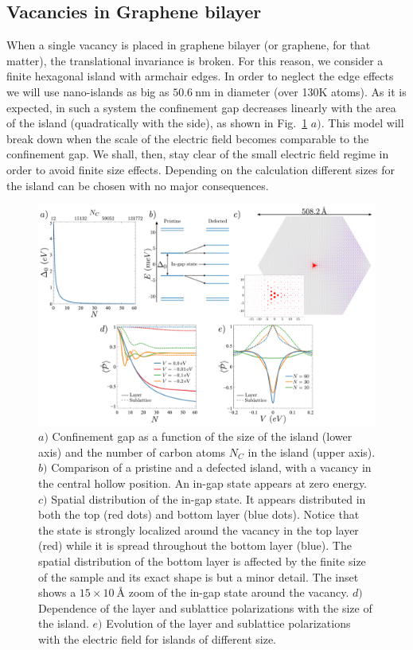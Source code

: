 \subsection{Vacancies in Graphene bilayer}
When a single vacancy is placed in graphene bilayer (or graphene, for that matter), the translational invariance is broken. For this reason, we consider a finite hexagonal island with armchair edges. In order to neglect the edge effects we will use nano-islands as big as $\SI{50.6}{\nm}$ in diameter (over 130K atoms). %
As it is expected, in such a system the confinement gap decreases linearly with the area of the island (quadratically with the side), as shown in Fig.~\ref{confinement} $a)$. This model will break down when the scale of the electric field becomes comparable to the confinement gap. We shall, then, stay clear of the small electric field regime in order to avoid finite size effects. Depending on the calculation different sizes for the island can be chosen with no major consequences.
\begin{figure}[!ht!]
\centering
\includegraphics[width=\textwidth]{artlat/fig/confinement.pdf}
\vspace{-20pt}
\caption{$a)$ Confinement gap as a function of the size of the island (lower axis) and the number of carbon atoms $N_C$ in the island (upper axis). $b)$ Comparison of a pristine and a defected island, with a vacancy in the central hollow position. An in-gap state appears at zero energy. $c)$ Spatial distribution of the in-gap state. It appears distributed in both the top (red dots) and bottom layer (blue dots). Notice that the state is strongly localized around the vacancy in the top layer (red) while it is spread throughout the bottom layer (blue). The spatial distribution of the bottom layer is affected by the finite size of the sample and its exact shape is but a minor detail. The inset shows a $15\times\SI{10}{\angstrom}$ zoom of the in-gap state around the vacancy. $d)$ Dependence of the layer and sublattice polarizations with the size of the island. $e)$ Evolution of the layer and sublattice polarizations with the electric field for islands of different size.}
\label{confinement}
\end{figure}

